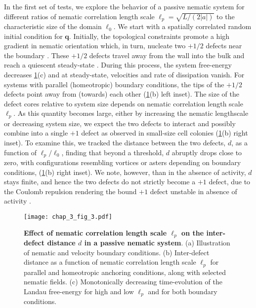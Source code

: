 In the first set of tests,  we explore the behavior of a passive nematic system for different ratios of nematic correlation length scale $\ell_p = \sqrt{L/\left(2|a|\right)}$ to the characteristic size of the domain $\ell_0$.  We start with a spatially correlated random initial condition for $\bm{q}$.  Initially, the topological constraints promote a high gradient in nematic orientation which, in turn, nucleate two $+1/2$ defects near the boundary \cite{hardouin2019,giomi2014}. These $+1/2$ defects travel away from the wall into the bulk and reach a quiescent steady-state \cite{giomi2014}. During this process, the system free-energy decreases \ref{sec_1_chap_3_fig_3}(c) and at steady-state, velocities and rate of dissipation vanish. For systems with parallel (homeotropic) boundary conditions, the tips of the $+1/2$ defects point away from (towards) each other (\ref{sec_1_chap_3_fig_3}(b) left inset). The size of the defect cores relative to system size depends on nematic correlation length scale $\ell_p$. As this quantity becomes large, either by increasing the nematic lengthscale or decreasing system size, we expect the two defects to interact and possibly combine into a single $+1$ defect as observed in small-size cell colonies (\ref{sec_1_chap_3_fig_3}(b) right inset). To examine this, we tracked the distance between the two defects, $d$, as a function of  $\ell_p/\ell_0$, finding that beyond a threshold, $d$ abruptly drops close to zero, with configurations resembling vortices or asters depending on boundary conditions, (\ref{sec_1_chap_3_fig_3}(b) right inset). We note, however, than in the absence of activity, $d$ stays finite, and hence the two defects do not strictly become a $+1$ defect, due to the Coulomb repulsion rendering the bound $+1$ defect unstable in absence of activity \cite{thijssen2020, vafa2020}.
\begin{figure}[H]
	\centering
	\texttt{[image: chap\_3\_fig\_3.pdf]}
\caption{\label{sec_1_chap_3_fig_3} \textbf{Effect of nematic correlation length scale $\ell_p$ on the inter-defect distance $d$ in a passive nematic system}. (a) Illustration of nematic and velocity boundary conditions. (b) Inter-defect distance as a function of nematic correlation length scale $\ell_p$ for parallel and homeotropic anchoring conditions, along with selected nematic fields. (c) Monotonically decreasing time-evolution of the Landau free-energy for high and low $\ell_p$ and for both boundary conditions.}
\end{figure}
